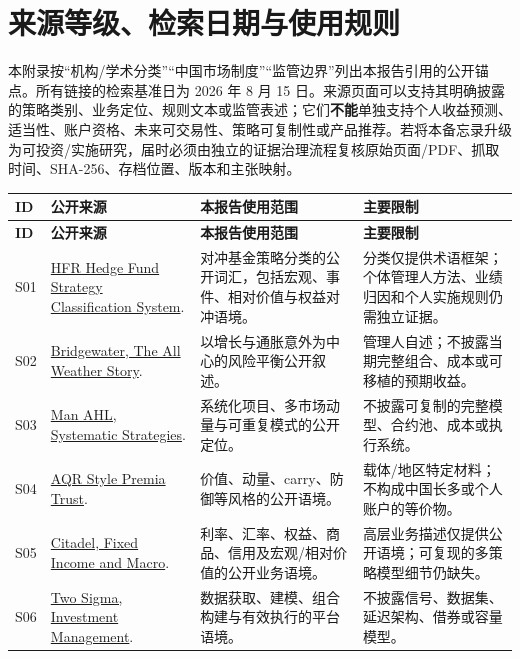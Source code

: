 \section{来源等级、检索日期与使用规则}

本附录按“机构/学术分类”“中国市场制度”“监管边界”列出本报告引用的公开锚点。所有链接的检索基准日为 2026 年 8 月 15 日。来源页面可以支持其明确披露的策略类别、业务定位、规则文本或监管表述；它们\textbf{不能}单独支持个人收益预测、适当性、账户资格、未来可交易性、策略可复制性或产品推荐。若将本备忘录升级为可投资/实施研究，届时必须由独立的证据治理流程复核原始页面/PDF、抓取时间、SHA-256、存档位置、版本和主张映射。

\begin{longtable}{L{0.85cm} L{4.0cm} L{4.1cm} L{4.35cm}}
\toprule
\textbf{ID} & \textbf{公开来源} & \textbf{本报告使用范围} & \textbf{主要限制} \\
\midrule
\endfirsthead
\toprule
\textbf{ID} & \textbf{公开来源} & \textbf{本报告使用范围} & \textbf{主要限制} \\
\midrule
\endhead
S01 & \href{https://www.hfr.com/hfr-indices/hfr-hedge-fund-strategy-classifications/}{HFR Hedge Fund Strategy Classification System}. & 对冲基金策略分类的公开词汇，包括宏观、事件、相对价值与权益对冲语境。 & 分类仅提供术语框架；个体管理人方法、业绩归因和个人实施规则仍需独立证据。 \\
S02 & \href{https://www.bridgewater.com/research-and-insights/the-all-weather-story}{Bridgewater, The All Weather Story}. & 以增长与通胀意外为中心的风险平衡公开叙述。 & 管理人自述；不披露当期完整组合、成本或可移植的预期收益。 \\
S03 & \href{https://www.man.com/ahl}{Man AHL, Systematic Strategies}. & 系统化项目、多市场动量与可重复模式的公开定位。 & 不披露可复制的完整模型、合约池、成本或执行系统。 \\
S04 & \href{https://australia.aqr.com/funds/aqr-style-premia-trust/}{AQR Style Premia Trust}. & 价值、动量、carry、防御等风格的公开语境。 & 载体/地区特定材料；不构成中国长多或个人账户的等价物。 \\
S05 & \href{https://www.citadel.com/what-we-do/fixed-income-and-macro/}{Citadel, Fixed Income and Macro}. & 利率、汇率、权益、商品、信用及宏观/相对价值的公开业务语境。 & 高层业务描述仅提供公开语境；可复现的多策略模型细节仍缺失。 \\
S06 & \href{https://www.twosigma.com/businesses/investment-management/}{Two Sigma, Investment Management}. & 数据获取、建模、组合构建与有效执行的平台语境。 & 不披露信号、数据集、延迟架构、借券或容量模型。 \\

\end{longtable}
